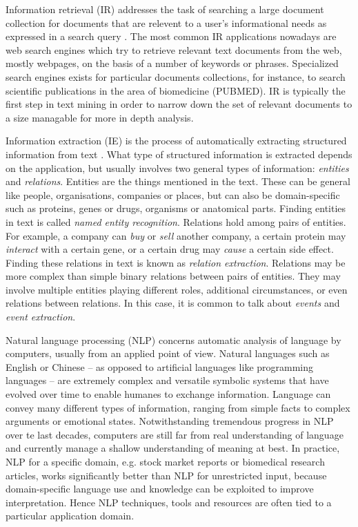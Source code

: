 \documentclass[11pt,oneside,a4paper]{report}
\begin{document}
Information retrieval (IR) addresses the task of searching a large document collection for documents that are relevent to a user's informational needs as expressed in a search query \citep{ManningRaghavanSchutze:08}. 
The most common IR applications nowadays are web search engines which try to retrieve relevant text documents from the web, mostly webpages, on the basis of a number of keywords or phrases.
Specialized search engines exists for particular documents collections, for instance, to search scientific publications in the area of biomedicine (PUBMED).
IR is typically the first step in text mining in order to narrow down the set of relevant documents to a size managable for more in depth analysis.

Information extraction (IE) is the process of automatically extracting structured information from text \citep{Jiang2012Information}.
What type of structured information is extracted depends on the application, but usually involves two general types of information: \emph{entities} and \emph{relations}.
Entities are the things mentioned in the text.
These can be general like people, organisations, companies or places, but can also be domain-specific such as proteins, genes or drugs, organisms or anatomical parts.
Finding entities in text is called \emph{named entity recognition}.
Relations hold among pairs of entities.
For example, a company can \emph{buy} or \emph{sell} another company, a certain protein may \emph{interact} with a certain gene, or a certain drug may \emph{cause} a certain side effect.
Finding these relations in text is known as \emph{relation extraction}.  
Relations may be more complex than simple binary relations between pairs of entities.
They may involve multiple entities playing different roles, additional circumstances, or even relations between relations.
In this case, it is common to talk about \emph{events} and \emph{event extraction}.

Natural language processing (NLP) concerns automatic analysis of language by computers, usually from an applied point of view.  
Natural languages such as English or Chinese -- as opposed to artificial languages like programming languages -- are extremely complex and versatile symbolic systems that have evolved over time to enable humanes to exchange information.
Language can convey many different types of information, ranging from simple facts to complex arguments or emotional states.
Notwithstanding tremendous progress in NLP over te last decades, computers are still far from real understanding of language and currently manage a shallow understanding of meaning at best.
In practice, NLP for a specific domain, e.g. stock market reports or biomedical research articles, works significantly better than NLP for unrestricted input, because domain-specific language use and knowledge can be exploited to improve interpretation. 
Hence NLP techniques, tools and resources are often tied to a particular application domain.
\end{document}
